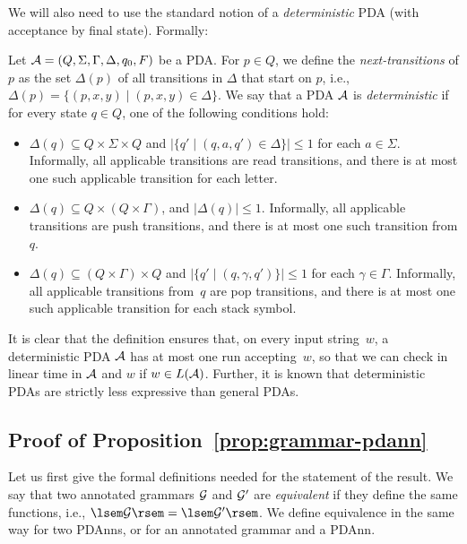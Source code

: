 We will also need to use the standard notion of a \emph{deterministic} PDA (with
acceptance by final state). Formally:
\begin{definition}
  \label{def:dpda}
  Let $\mathcal{A} = (Q, \Sigma, \Gamma, \Delta, q_0, F)$ be a PDA. For $p \in Q$, we define the \emph{next-transitions} of $p$ as the set $\Delta(p)$ of all transitions in $\Delta$ that start on $p$, i.e.,  $\Delta(p) = \{(p, x, y) \mid (p, x, y) \in \Delta\}$.
  We say that a PDA $\mathcal{A}$ is \emph{deterministic} if
%
%
%
%
%
%
%
%
%
%
%
%
%
%
%
for every state $q \in Q$, one of the following conditions hold:
\begin{itemize}
	\item[(a)] $\Delta(q) \subseteq Q \times \Sigma \times Q$ and $|\{q'\mid
          (q, a, q')\in \Delta\}| \leq 1$ for each $a\in\Sigma$. Informally, all
          applicable transitions are read transitions, and there is at most one such
          applicable transition for each letter.
	\item[(b)] $\Delta(q) \subseteq Q \times (Q \times \Gamma)$, and
          $|\Delta(q)| \leq 1$. Informally, all applicable transitions are push
          transitions, and there is at most one such transition from $q$.
	\item[(c)] $\Delta(q) \subseteq (Q \times \Gamma) \times Q$ and
          $|\{q'\mid (q, \gamma, q')\}| \leq 1$ for each $\gamma \in \Gamma$.
          Informally, all applicable
          transitions from~$q$ are pop transitions, and there is at most one
          such applicable transition for each stack symbol.
\end{itemize}
\end{definition}

It is clear that the definition ensures that, on every input string~$w$, a
deterministic PDA $\mathcal{A}$ has at most one run accepting~$w$, so that we can
check in linear time in $\mathcal{A}$ and $w$ if $w \in L(\mathcal{A})$. Further, it is known that
deterministic PDAs are strictly less expressive than general PDAs.


\subsection{Proof of Proposition~\ref{prop:grammar-pdann}}
\label{apx:grammar-pdann}

Let us first give the formal definitions needed for the statement of the result.
We say that two annotated grammars
$\mathcal{G}$ and $\mathcal{G}'$ are \emph{equivalent} if they define the same functions, i.e.,
$\sem{\cG} = \sem{\cG'}$. We define equivalence in the same way for two PDAnns, or
for an annotated grammar and a PDAnn.

